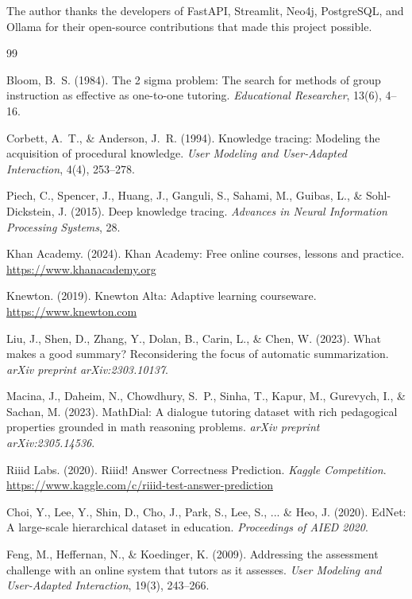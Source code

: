 \documentclass[12pt,a4paper]{article}
\begin{document}
The author thanks the developers of FastAPI, Streamlit, Neo4j, PostgreSQL,
and Ollama for their open-source contributions that made this project
possible.

\begin{thebibliography}{99}

Bloom, B.~S. (1984).
\newblock The 2 sigma problem: The search for methods of group instruction as
  effective as one-to-one tutoring.
\newblock \textit{Educational Researcher}, 13(6), 4--16.

Corbett, A.~T., \& Anderson, J.~R. (1994).
\newblock Knowledge tracing: Modeling the acquisition of procedural knowledge.
\newblock \textit{User Modeling and User-Adapted Interaction}, 4(4), 253--278.

Piech, C., Spencer, J., Huang, J., Ganguli, S., Sahami, M., Guibas, L., \&
  Sohl-Dickstein, J. (2015).
\newblock Deep knowledge tracing.
\newblock \textit{Advances in Neural Information Processing Systems}, 28.

Khan Academy. (2024).
\newblock Khan Academy: Free online courses, lessons and practice.
\newblock \url{https://www.khanacademy.org}

Knewton. (2019).
\newblock Knewton Alta: Adaptive learning courseware.
\newblock \url{https://www.knewton.com}

Liu, J., Shen, D., Zhang, Y., Dolan, B., Carin, L., \& Chen, W. (2023).
\newblock What makes a good summary? Reconsidering the focus of automatic
  summarization.
\newblock \textit{arXiv preprint arXiv:2303.10137}.

Macina, J., Daheim, N., Chowdhury, S.~P., Sinha, T., Kapur, M., Gurevych, I.,
  \& Sachan, M. (2023).
\newblock MathDial: A dialogue tutoring dataset with rich pedagogical
  properties grounded in math reasoning problems.
\newblock \textit{arXiv preprint arXiv:2305.14536}.

Riiid Labs. (2020).
\newblock Riiid! Answer Correctness Prediction.
\newblock \textit{Kaggle Competition}.
\newblock \url{https://www.kaggle.com/c/riiid-test-answer-prediction}

Choi, Y., Lee, Y., Shin, D., Cho, J., Park, S., Lee, S., ... \& Heo, J. (2020).
\newblock EdNet: A large-scale hierarchical dataset in education.
\newblock \textit{Proceedings of AIED 2020}.

Feng, M., Heffernan, N., \& Koedinger, K. (2009).
\newblock Addressing the assessment challenge with an online system that tutors
  as it assesses.
\newblock \textit{User Modeling and User-Adapted Interaction}, 19(3), 243--266.

\end{thebibliography}
\end{document}
